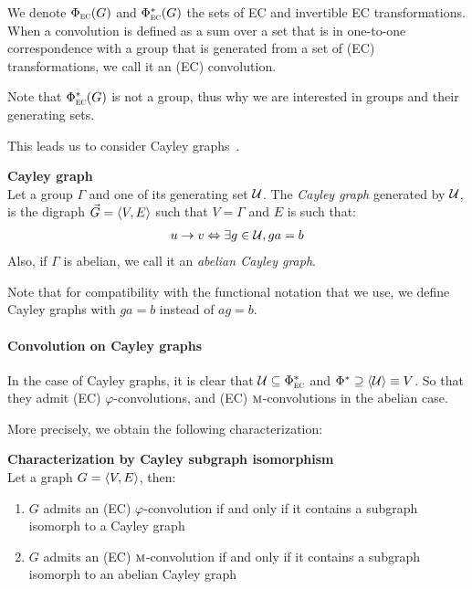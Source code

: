 We denote $\Phi_{\operatorname{\textsc{ec}}}(G)$ and $\Phi^*_{\operatorname{\textsc{ec}}}(G)$ the sets of EC and invertible EC transformations. When a convolution is defined as a sum over a set that is in one-to-one correspondence with a group that is generated from a set of (EC) transformations, we call it an (EC) convolution.

\begin{remark}
Note that $\Phi^*_{\operatorname{\textsc{ec}}}(G)$ is not a group, thus why we are interested in groups and their generating sets.
\end{remark}

This leads us to consider Cayley graphs~\citep{cayley1878desiderata,wiki:cayley}.

\begin{definition}\textbf{Cayley graph}\\
Let a group $\Gamma$ and one of its generating set $\mathcal{U}$. The \emph{Cayley graph} generated by $\mathcal{U}$, is the digraph $\vec{G} = \langle V, E \rangle$ such that $V = \Gamma$ and $E$ is such that:
\begin{gather*}
u \rightarrow v \Leftrightarrow \exists g \in \mathcal{U}, ga = b
\end{gather*}
Also, if $\Gamma$ is abelian, we call it an \emph{abelian Cayley graph}.
\end{definition}

\begin{remark}
Note that for compatibility with the functional notation that we use, we define Cayley graphs with $ga = b$ instead of $ag = b$.
\end{remark}

\paragraph{Convolution on Cayley graphs}
In the case of Cayley graphs, it is clear that $\mathcal{U} \subseteq \Phi^*_{\operatorname{\textsc{ec}}}$ and $\Phi^* \supseteq \langle \mathcal{U} \rangle \equiv V$. So that they admit (EC) $\varphi$-convolutions, and (EC) $\operatorname{\textsc{m}}$-convolutions in the abelian case.

More precisely, we obtain the following characterization:

\begin{proposition}\textbf{Characterization by Cayley subgraph isomorphism}\\
Let a graph $G = \langle V, E \rangle$, then:
\begin{enumerate}[label=(\roman*)]
\item $G$ admits an (EC) $\varphi$-convolution if and only if it contains a subgraph isomorph to a Cayley graph
\item $G$ admits an (EC) $\operatorname{\textsc{m}}$-convolution if and only if it contains a subgraph isomorph to an abelian Cayley graph
\end{enumerate}
\end{proposition}

